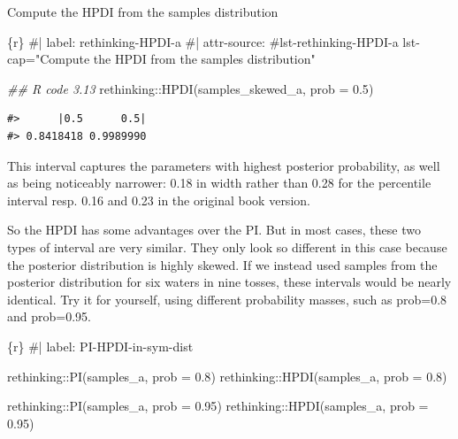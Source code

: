 \documentclass[
  letterpaper,
  DIV=11,
  numbers=noendperiod]{scrreprt}
\newenvironment{Shaded}{\begin{snugshade}}{\end{snugshade}}
\newcommand{\AttributeTok}[1]{\textcolor[rgb]{0.40,0.45,0.13}{#1}}
\newcommand{\CommentTok}[1]{\textcolor[rgb]{0.37,0.37,0.37}{#1}}
\newcommand{\DocumentationTok}[1]{\textcolor[rgb]{0.37,0.37,0.37}{\textit{#1}}}
\newcommand{\FloatTok}[1]{\textcolor[rgb]{0.68,0.00,0.00}{#1}}
\newcommand{\FunctionTok}[1]{\textcolor[rgb]{0.28,0.35,0.67}{#1}}
\newcommand{\InformationTok}[1]{\textcolor[rgb]{0.37,0.37,0.37}{#1}}
\newcommand{\NormalTok}[1]{\textcolor[rgb]{0.00,0.23,0.31}{#1}}
\newcommand{\SpecialCharTok}[1]{\textcolor[rgb]{0.37,0.37,0.37}{#1}}
\begin{document}
\begin{codelisting}

\caption{Compute the HPDI from the samples distribution}

\hypertarget{lst-rethinking-HPDI-a}{%
\label{lst-rethinking-HPDI-a}}%
\begin{Shaded}
\begin{Highlighting}[]
\InformationTok{\textasciigrave{}\textasciigrave{}\textasciigrave{}\{r\}}
\CommentTok{\#| label: rethinking{-}HPDI{-}a}
\CommentTok{\#| attr{-}source: \textquotesingle{}\#lst{-}rethinking{-}HPDI{-}a lst{-}cap="Compute the HPDI from the samples distribution"\textquotesingle{}}

\DocumentationTok{\#\# R code 3.13}
\NormalTok{rethinking}\SpecialCharTok{::}\FunctionTok{HPDI}\NormalTok{(samples\_skewed\_a, }\AttributeTok{prob =} \FloatTok{0.5}\NormalTok{)}
\InformationTok{\textasciigrave{}\textasciigrave{}\textasciigrave{}}
\end{Highlighting}
\end{Shaded}

\end{codelisting}

\begin{verbatim}
#>      |0.5      0.5| 
#> 0.8418418 0.9989990
\end{verbatim}

This interval captures the parameters with highest posterior
probability, as well as being noticeably narrower: 0.18 in width rather
than 0.28 for the percentile interval resp. 0.16 and 0.23 in the
original book version.

So the HPDI has some advantages over the PI. But in most cases, these
two types of interval are very similar. They only look so different in
this case because the posterior distribution is highly skewed. If we
instead used samples from the posterior distribution for six waters in
nine tosses, these intervals would be nearly identical. Try it for
yourself, using different probability masses, such as prob=0.8 and
prob=0.95.

\begin{Shaded}
\begin{Highlighting}[]
\InformationTok{\textasciigrave{}\textasciigrave{}\textasciigrave{}\{r\}}
\CommentTok{\#| label: PI{-}HPDI{-}in{-}sym{-}dist}

\NormalTok{rethinking}\SpecialCharTok{::}\FunctionTok{PI}\NormalTok{(samples\_a, }\AttributeTok{prob =} \FloatTok{0.8}\NormalTok{)}
\NormalTok{rethinking}\SpecialCharTok{::}\FunctionTok{HPDI}\NormalTok{(samples\_a, }\AttributeTok{prob =} \FloatTok{0.8}\NormalTok{)}

\NormalTok{rethinking}\SpecialCharTok{::}\FunctionTok{PI}\NormalTok{(samples\_a, }\AttributeTok{prob =} \FloatTok{0.95}\NormalTok{)}
\NormalTok{rethinking}\SpecialCharTok{::}\FunctionTok{HPDI}\NormalTok{(samples\_a, }\AttributeTok{prob =} \FloatTok{0.95}\NormalTok{)}
\InformationTok{\textasciigrave{}\textasciigrave{}\textasciigrave{}}
\end{Highlighting}
\end{Shaded}
\end{document}
